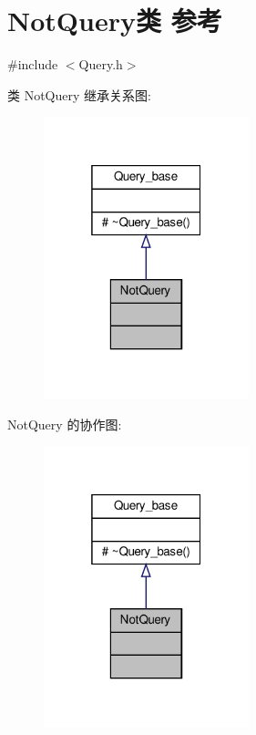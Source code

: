 \hypertarget{classNotQuery}{}\section{Not\+Query类 参考}
\label{classNotQuery}


{\ttfamily \#include $<$Query.\+h$>$}



类 Not\+Query 继承关系图\+:\nopagebreak
\begin{figure}[H]
\begin{center}
\leavevmode
\includegraphics[width=169pt]{classNotQuery__inherit__graph}
\end{center}
\end{figure}


Not\+Query 的协作图\+:\nopagebreak
\begin{figure}[H]
\begin{center}
\leavevmode
\includegraphics[width=169pt]{classNotQuery__coll__graph}
\end{center}
\end{figure}
